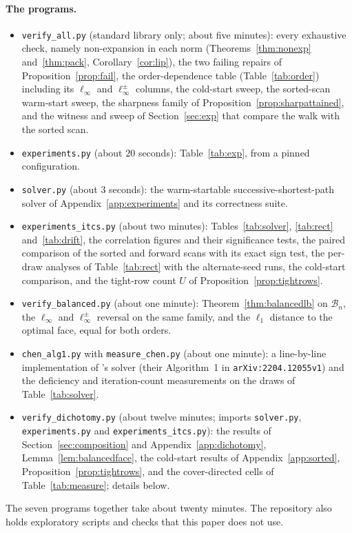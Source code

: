 \paragraph{The programs.}
\begin{itemize}
\item \texttt{verify\_all.py} (standard library only; about five minutes): every exhaustive
check, namely non-expansion in each norm (Theorems~\ref{thm:nonexp} and~\ref{thm:pack},
Corollary~\ref{cor:lip}), the two failing repairs of Proposition~\ref{prop:fail}, the
order-dependence table (Table~\ref{tab:order}) including its $\ell_\infty$ and $\ell_\infty^\pm$
columns, the cold-start sweep, the sorted-scan warm-start sweep, the sharpness family of
Proposition~\ref{prop:sharpattained}, and the witness and sweep of
Section~\ref{sec:exp} that compare the walk with the sorted scan.
\item \texttt{experiments.py} (about $20$ seconds): Table~\ref{tab:exp}, from a pinned
configuration.
\item \texttt{solver.py} (about $3$ seconds): the warm-startable successive-shortest-path solver
of Appendix~\ref{app:experiments} and its correctness suite.
\item \texttt{experiments\_itcs.py} (about two minutes): Tables~\ref{tab:solver},
\ref{tab:rect} and~\ref{tab:drift}, the correlation figures and their significance tests, the
paired comparison of the sorted and forward scans with its exact sign test, the per-draw
analyses of Table~\ref{tab:rect} with the alternate-seed runs, the cold-start comparison,
and the tight-row count $U$ of Proposition~\ref{prop:tightrows}.
\item \texttt{verify\_balanced.py} (about one minute): Theorem~\ref{thm:balancedlb} on
$\mathcal{B}_n$, the $\ell_\infty$ and $\ell_\infty^\pm$ reversal on the same family, and the
$\ell_1$ distance to the optimal face, equal for both orders.
\item \texttt{chen\_alg1.py} with \texttt{measure\_chen.py} (about one minute): a line-by-line
implementation of \citeauthor{chen2022}'s solver (their Algorithm~1 in \texttt{arXiv:2204.12055v1}) and the
deficiency and iteration-count measurements on the draws of Table~\ref{tab:solver}.
\item \texttt{verify\_dichotomy.py} (about twelve minutes; imports \texttt{solver.py},
\texttt{experiments.py} and \texttt{experiments\_itcs.py}): the results of
Section~\ref{sec:composition} and Appendix~\ref{app:dichotomy}, Lemma~\ref{lem:balancedface}, the
cold-start results of Appendix~\ref{app:sorted}, Proposition~\ref{prop:tightrows}, and the
cover-directed cells of Table~\ref{tab:measure}; details below.
\end{itemize}
The seven programs together take about twenty minutes. The repository also holds exploratory
scripts and checks that this paper does not use.

